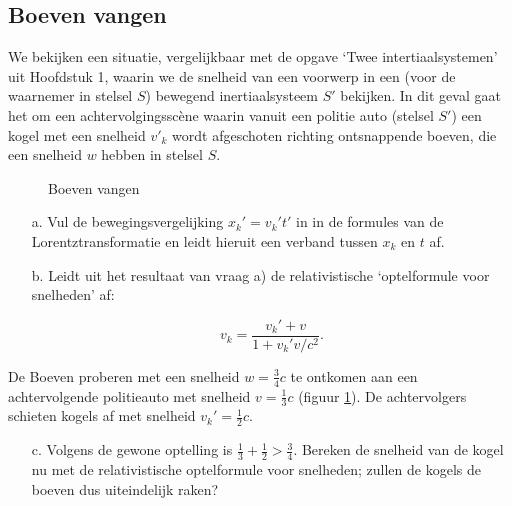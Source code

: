 \subsection{Boeven vangen}

We bekijken een situatie, vergelijkbaar met de opgave `Twee intertiaalsystemen' uit Hoofdstuk 1, waarin we de snelheid van een voorwerp in een (voor de waarnemer in stelsel $S$) bewegend inertiaalsysteem $S'$ bekijken. In dit geval gaat het om een achtervolgingssc\`ene waarin vanuit een politie auto (stelsel $S'$) een kogel met een snelheid $v'_k$ wordt afgeschoten richting ontsnappende boeven, die een snelheid $w$ hebben in stelsel $S$.


 \begin{figure} [h]
 \begin{center}
 \mbox{\epsfxsize=14cm}
 \caption{Boeven vangen}
 \label{f:boeven}
 \end{center}
 \end{figure}





\begin{itemize}
\item [a.]
  Vul  de  bewegingsvergelijking  $x_k' = v_k't'$ in in de formules van de 
Lorentztransformatie en leidt hieruit een verband tussen 
$x_k$ en $t$ af.
\item [b.]
  Leidt uit het resultaat van vraag a) de relativistische `optelformule voor snelheden' af: 

\begin{displaymath}
  v_k = \frac{v_k' + v}{1 + v_k'v/c^{2}}.
\end{displaymath}
\end{itemize}

De Boeven proberen met een snelheid $w =\frac{3}{4}c$ te ontkomen aan een 
achtervolgende politieauto met snelheid 
$v = \frac{1}{3}c$ (figuur \ref{f:boeven}).
De achtervolgers schieten kogels af met snelheid $v_k'=\frac{1}{2}c$.
\begin{itemize}
\item [c.]
  Volgens de gewone optelling is $\frac{1}{3} + \frac{1}{2} > \frac{3}{4}$. 
Bereken de snelheid van de kogel nu met de relativistische optelformule voor snelheden; zullen de kogels de boeven dus uiteindelijk raken?

\end{itemize}

